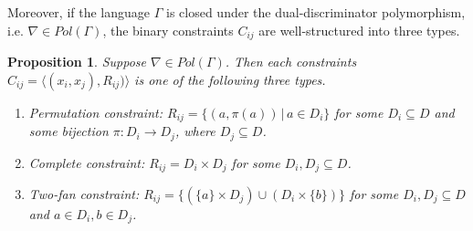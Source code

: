 \documentclass[11pt]{article}
\newcommand{\1}{\textbf{1}}
\newtheorem{proposition}[theorem]{Proposition}
\begin{document}
Moreover, if the language $\Gamma$ is closed under the dual-discriminator polymorphism, i.e. $\nabla \in Pol(\Gamma)$, the binary constraints $C_{ij}$ are well-structured into three types.

\begin{proposition}\cite{Cooper1994CharacterisingTC}
    Suppose $\nabla \in Pol(\Gamma)$. Then each constraints $C_{ij} = \langle (x_i,x_j),R_{ij}) \rangle$ is one of the following three types.
    \begin{enumerate}
        \item Permutation constraint: $R_{ij} = \{(a, \pi(a)) \, | \, a \in D_i \}$ for some $D_i \subseteq D$ and some bijection $\pi:D_i \rightarrow D_j$, where $D_j \subseteq D$.
        \item Complete constraint: $R_{ij} = D_i \times D_j$ for some $D_i, D_j \subseteq D$.
        \item Two-fan constraint: $R_{ij} = \{(\{a\} \times D_j) \cup (D_i \times \{ b \})\}$ for some $D_i, D_j \subseteq D$ and $a \in D_i, b \in D_j$.
    \end{enumerate}
\end{proposition}
\end{document}
